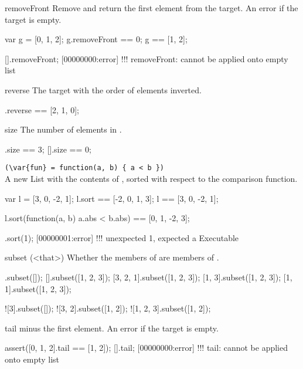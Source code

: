 \begin{urbiscriptapi}
\item[removeFront]
Remove and return the first element from the target. An error if the
target is empty.

\begin{urbiassert}
var g = [0, 1, 2];
g.removeFront == 0;
g == [1, 2];

[].removeFront;
[00000000:error] !!! removeFront: cannot be applied onto empty list
\end{urbiassert}

\item[reverse]
  The target with the order of elements inverted.
\begin{urbiassert}
[0, 1, 2].reverse == [2, 1, 0];
\end{urbiassert}

\item[size]
  The number of elements in \this.
\begin{urbiassert}
[0, 1, 2].size == 3;
[].size == 0;
\end{urbiassert}

\item {}\lstinline|(\var{fun} = function(a, b) { a < b })|\\%
  A new List with the contents of \this, sorted with respect to the
   comparison function.
\begin{urbiassert}
var l = [3, 0, -2, 1];
l.sort == [-2, 0, 1, 3];
l      == [3, 0, -2, 1];

l.sort(function(a, b) {a.abs < b.abs})
       == [0, 1, -2, 3];
\end{urbiassert}

\begin{urbiscript}
[2, 1].sort(1);
[00000001:error] !!! unexpected 1, expected a Executable
\end{urbiscript}

\item[subset](<that>)%
  Whether the members of \this are members of .

\begin{urbiassert}
        [].subset([]);
        [].subset([1, 2, 3]);
 [3, 2, 1].subset([1, 2, 3]);
    [1, 3].subset([1, 2, 3]);
    [1, 1].subset([1, 2, 3]);

      ![3].subset([]);
   ![3, 2].subset([1, 2]);
![1, 2, 3].subset([1, 2]);
\end{urbiassert}


\item[tail]%
  \this minus the first element. An error if the target is empty.
\begin{urbiscript}
assert([0, 1, 2].tail == [1, 2]);
[].tail;
[00000000:error] !!! tail: cannot be applied onto empty list
\end{urbiscript}



\end{urbiscriptapi}
